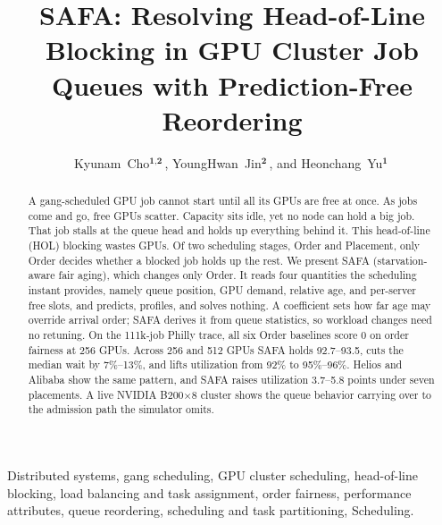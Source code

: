 \documentclass{ieeetj}
\def\authorrefmark#1{\ensuremath{^{\textbf{#1}}}}
\begin{document}


\title{SAFA: Resolving Head-of-Line Blocking in GPU Cluster Job Queues with Prediction-Free Reordering}

\author{Kyunam~Cho\authorrefmark{1,2}\,, YoungHwan~Jin\authorrefmark{2}\,, and Heonchang~Yu\authorrefmark{1}\,}

\begin{abstract}
A gang-scheduled GPU job cannot start until all its GPUs are free at once. As jobs come and go, free GPUs scatter. Capacity sits idle, yet no node can hold a big job. That job stalls at the queue head and holds up everything behind it. This head-of-line (HOL) blocking wastes GPUs. Of two scheduling stages, Order and Placement, only Order decides whether a blocked job holds up the rest. We present SAFA (starvation-aware fair aging), which changes only Order. It reads four quantities the scheduling instant provides, namely queue position, GPU demand, relative age, and per-server free slots, and predicts, profiles, and solves nothing. A coefficient sets how far age may override arrival order; SAFA derives it from queue statistics, so workload changes need no retuning. On the 111k-job Philly trace, all six Order baselines score 0 on order fairness at 256 GPUs. Across 256 and 512 GPUs SAFA holds 92.7--93.5, cuts the median wait by 7\%--13\%, and lifts utilization from 92\% to 95\%--96\%. Helios and Alibaba show the same pattern, and SAFA raises utilization 3.7--5.8 points under seven placements. A live NVIDIA B200$\times$8 cluster shows the queue behavior carrying over to the admission path the simulator omits.
\end{abstract}

\begin{IEEEkeywords}
Distributed systems, gang scheduling, GPU cluster scheduling, head-of-line blocking, load balancing and task assignment, order fairness, performance attributes, queue reordering, scheduling and task partitioning, Scheduling.
\end{IEEEkeywords}
\end{document}
